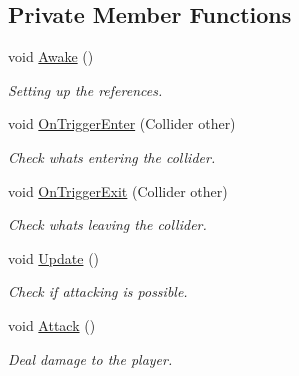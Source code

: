 \subsection*{Private Member Functions}
\begin{DoxyCompactItemize}
\item 
void \mbox{\hyperlink{class_enemy_attack_a38a705cd3e92cd80342beaab053aa3b0}{Awake}} ()
\begin{DoxyCompactList}\small\item\em Setting up the references. \end{DoxyCompactList}\item 
void \mbox{\hyperlink{class_enemy_attack_a6375d6dcf8affa64d68d8f9092f8e924}{On\+Trigger\+Enter}} (Collider other)
\begin{DoxyCompactList}\small\item\em Check what\textquotesingle{}s entering the collider. \end{DoxyCompactList}\item 
void \mbox{\hyperlink{class_enemy_attack_ab7f1e6aeadeaf6c98fd0e5d51f0623cb}{On\+Trigger\+Exit}} (Collider other)
\begin{DoxyCompactList}\small\item\em Check what\textquotesingle{}s leaving the collider. \end{DoxyCompactList}\item 
void \mbox{\hyperlink{class_enemy_attack_a1126b50974e33d82218df74b63836fb2}{Update}} ()
\begin{DoxyCompactList}\small\item\em Check if attacking is possible. \end{DoxyCompactList}\item 
void \mbox{\hyperlink{class_enemy_attack_a44753db46321d7ac4a32b6f41426d36d}{Attack}} ()
\begin{DoxyCompactList}\small\item\em Deal damage to the player. \end{DoxyCompactList}\end{DoxyCompactItemize}
